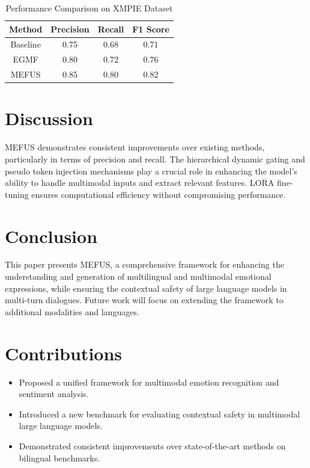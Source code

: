 \documentclass{article}
\begin{document}
\begin{table}[ht]
    \centering
    \begin{tabular}{|c|c|c|c|}
    \hline
    Method & Precision & Recall & F1 Score \\
    \hline
    Baseline & 0.75 & 0.68 & 0.71 \\
    EGMF \cite{qiao2026unifiedframeworkemotionrecognition} & 0.80 & 0.72 & 0.76 \\
    MEFUS & 0.85 & 0.80 & 0.82 \\
    \hline
    \end{tabular}
    \caption{Performance Comparison on XMPIE Dataset}
    \label{tab:results}
\end{table}

\section{Discussion}
MEFUS demonstrates consistent improvements over existing methods, particularly in terms of precision and recall. The hierarchical dynamic gating and pseudo token injection mechanisms play a crucial role in enhancing the model's ability to handle multimodal inputs and extract relevant features. LORA fine-tuning ensures computational efficiency without compromising performance.

\section{Conclusion}
This paper presents MEFUS, a comprehensive framework for enhancing the understanding and generation of multilingual and multimodal emotional expressions, while ensuring the contextual safety of large language models in multi-turn dialogues. Future work will focus on extending the framework to additional modalities and languages.

\section{Contributions}
\begin{itemize}
    \item Proposed a unified framework for multimodal emotion recognition and sentiment analysis.
    \item Introduced a new benchmark for evaluating contextual safety in multimodal large language models.
    \item Demonstrated consistent improvements over state-of-the-art methods on bilingual benchmarks.
\end{itemize}
\end{document}
